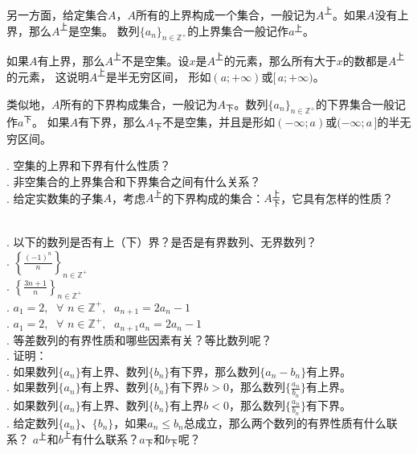 \documentclass[12pt,UTF8]{ctexbook}
\begin{document}
另一方面，给定集合$A$，$A$所有的上界构成一个集合，一般记为$A^{\text{上}}$。如果$A$没有上界，那么$A^{\text{上}}$是空集。
数列$\{a_n\}_{n\in\mathbb{Z}^+}$的上界集合一般记作$a^{\text{上}}$。

如果$A$有上界，那么$A^{\text{上}}$不是空集。设$x$是$A^{\text{上}}$的元素，那么所有大于$x$的数都是$A^{\text{上}}$的元素，
这说明$A^{\text{上}}$是半无穷区间，
形如$(a; +\infty)$或$[\,a;+\infty)$。

类似地，$A$所有的下界构成集合，一般记为$A_{\text{下}}$。数列$\{a_n\}_{n\in\mathbb{Z}^+}$的下界集合一般记作$a^{\text{下}}$。
如果$A$有下界，那么$A_{\text{下}}$不是空集，并且是形如$(-\infty; a)$或$(-\infty; a\,]$的半无穷区间。

\begin{sk}
    . 空集的上界和下界有什么性质？\\
    . 非空集合的上界集合和下界集合之间有什么关系？\\
    . 给定实数集的子集$A$，考虑$A^{\text{上}}$的下界构成的集合：$A^{\text{上}}_{\text{下}}$，它具有怎样的性质？
\end{sk}
\begin{xt}
    \mbox{} \\
    . 以下的数列是否有上（下）界？是否是有界数列、无界数列？\\
    . $\left\{\frac{(-1)^n}{n}\right\}_{n\in\mathbb{Z}^+}$ \\
    . $\left\{\frac{3n + 1}{n}\right\}_{n\in\mathbb{Z}^+}$\\
    . $a_1 = 2, \;\,\, \forall \,\, n \in\mathbb{Z}^+, \;\,\, a_{n+1} = 2a_n - 1$\\
    . $a_1 = 2, \;\,\, \forall \,\, n \in\mathbb{Z}^+, \;\,\, a_{n+1}a_n = 2a_n - 1$\\
    . 等差数列的有界性质和哪些因素有关？等比数列呢？\\
    . 证明：\\
    . 如果数列$\{a_n\}$有上界、数列$\{b_n\}$有下界，那么数列$\{a_n - b_n\}$有上界。\\
    . 如果数列$\{a_n\}$有上界、数列$\{b_n\}$有下界$b>0$，那么数列$\{\frac{a_n}{b_n}\}$有上界。\\
    . 如果数列$\{a_n\}$有上界、数列$\{b_n\}$有上界$b<0$，那么数列$\{\frac{a_n}{b_n}\}$有下界。\\
    . 给定数列$\{a_n\}$、$\{b_n\}$，如果$a_n \leqslant b_n$总成立，那么两个数列的有界性质有什么联系？
    $a^{\text{上}}$和$b^{\text{上}}$有什么联系？$a_{\text{下}}$和$b_{\text{下}}$呢？
\end{xt}
\end{document}
